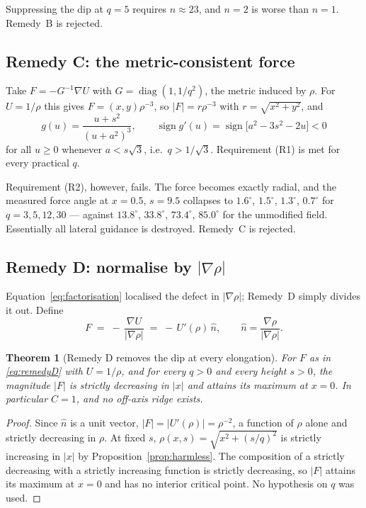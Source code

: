 \documentclass[11pt]{article}
\newtheorem{theorem}{Theorem}
\begin{document}
\noindent
Suppressing the dip at $q=5$ requires $n\approx23$, and $n=2$ is worse than
$n=1$. Remedy~B is rejected.

\subsection{Remedy C: the metric-consistent force}

Take $F=-G^{-1}\nabla U$ with $G=\operatorname{diag}(1,1/q^{2})$, the metric
induced by $\rho$. For $U=1/\rho$ this gives $F=(x,y)\rho^{-3}$, so
$|F|=r\rho^{-3}$ with $r=\sqrt{x^{2}+y^{2}}$, and
\begin{equation}
  g(u)=\frac{u+s^{2}}{(u+a^{2})^{3}},
  \qquad
  \operatorname{sign}g'(u)=\operatorname{sign}\bigl[a^{2}-3s^{2}-2u\bigr]<0
\end{equation}
for all $u\ge0$ whenever $a<s\sqrt3$, i.e.\ $q>1/\sqrt3$. Requirement (R1) is
met for every practical $q$.

Requirement (R2), however, fails. The force becomes exactly radial, and the
measured force angle at $x=0.5$, $s=9.5$ collapses to $1.6^{\circ}$,
$1.5^{\circ}$, $1.3^{\circ}$, $0.7^{\circ}$ for $q=3,5,12,30$ --- against
$13.8^{\circ}$, $33.8^{\circ}$, $73.4^{\circ}$, $85.0^{\circ}$ for the
unmodified field. Essentially all lateral guidance is destroyed. Remedy~C is
rejected.

\subsection{Remedy D: normalise by \texorpdfstring{$|\nabla\rho|$}{|grad rho|}}

Equation~\eqref{eq:factorisation} localised the defect in $|\nabla\rho|$;
Remedy~D simply divides it out. Define
\begin{equation}
  F \;=\; -\,\frac{\nabla U}{\bigl|\nabla\rho\bigr|}
    \;=\; -\,U'(\rho)\,\hat{n},
  \qquad
  \hat{n}=\frac{\nabla\rho}{\bigl|\nabla\rho\bigr|} .
  \label{eq:remedyD}
\end{equation}

\begin{theorem}[Remedy D removes the dip at every elongation]
\label{thm:D}
For $F$ as in \eqref{eq:remedyD} with $U=1/\rho$, and for every $q>0$ and
every height $s>0$, the magnitude $|F|$ is strictly decreasing in $|x|$ and
attains its maximum at $x=0$. In particular $C=1$, and no off-axis ridge
exists.
\end{theorem}

\begin{proof}
Since $\hat{n}$ is a unit vector, $|F|=|U'(\rho)|=\rho^{-2}$, a function of
$\rho$ alone and strictly decreasing in $\rho$. At fixed $s$,
$\rho(x,s)=\sqrt{x^{2}+(s/q)^{2}}$ is strictly increasing in $|x|$ by
Proposition~\ref{prop:harmless}. The composition of a strictly decreasing
with a strictly increasing function is strictly decreasing, so $|F|$ attains
its maximum at $x=0$ and has no interior critical point. No hypothesis on $q$
was used.
\end{proof}
\end{document}
